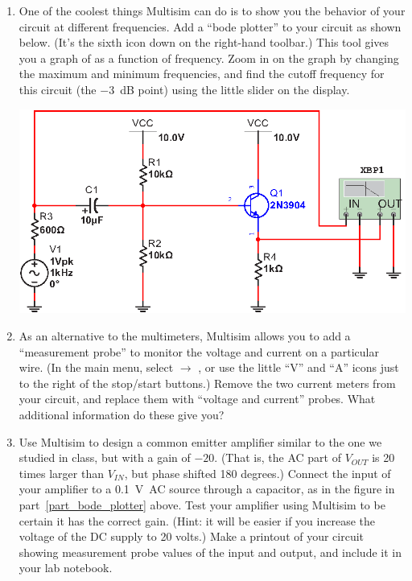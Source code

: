 \begin{enumerate}[wide]
\bigskip
\pagebreak[4]
\item One of the coolest things Multisim can do is to show you the behavior of your circuit at different frequencies.  Add a ``bode plotter'' to your circuit as shown below.  (It's the sixth icon down on the right-hand toolbar.)  This tool gives you a graph of   as a function of frequency.  Zoom in on the graph by changing the maximum and minimum frequencies, and find the cutoff frequency for this circuit (the $-3$~dB point) using the little slider on the display. \label{part_bode_plotter}
\begin{center}
\includegraphics{multisim/bode_plotter.eps}
\end{center}

\item As an alternative to the multimeters, Multisim allows you to add a ``measurement probe'' to monitor the voltage and current on a particular wire.  (In the main menu, select  $\longrightarrow$ , or use the little ``V'' and ``A'' icons just to the right of the stop/start buttons.)  Remove the two current meters from your circuit, and replace them with ``voltage and current'' probes.   What additional information do these give you?

\item Use Multisim to design a common emitter amplifier similar to the one we studied in class, but with a gain of  $-20$.  (That is, the AC part of $V_{OUT}$ is 20 times larger than $V_{IN}$, but phase shifted 180 degrees.)  Connect the input of your amplifier to a 0.1~V~AC source through a capacitor, as in the figure in part~\ref{part_bode_plotter} above.  Test your amplifier using Multisim to be certain it has the correct gain.  (Hint: it will be easier if you increase the voltage of the DC supply to 20 volts.)  Make a printout of your circuit showing measurement probe values of the input and output, and include it in your lab notebook. \label{part_emitter_follower}


\end{enumerate}
